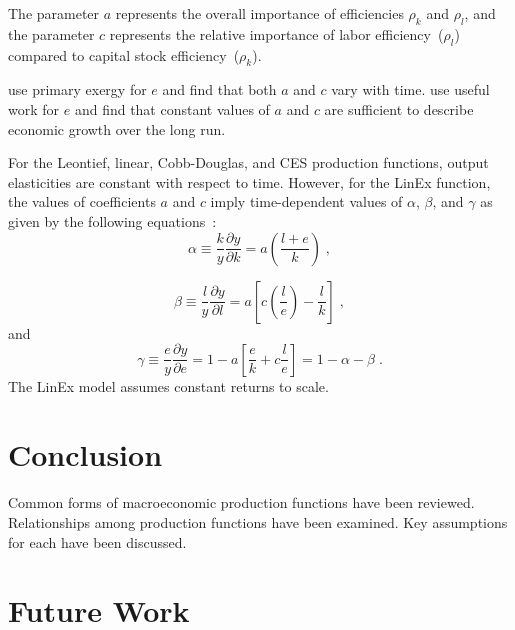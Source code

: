 \documentclass[preprint,authoryear,12pt]{elsarticle}
\begin{document}
The parameter $a$ represents the overall importance of efficiencies $\rho_k$ and $\rho_l$, 
and the parameter $c$ represents the relative importance 
of labor efficiency~($\rho_l$) compared to capital stock efficiency~($\rho_k$). 

\citet{Kummel:2010vz} use primary exergy for $e$ and find that 
both $a$ and $c$ vary with time.
\citet{Warr:2012cg} use useful work for $e$ and find that 
constant values of $a$ and $c$ are sufficient to describe economic growth 
over the long run. 

For the Leontief, linear, Cobb-Douglas, and CES production functions, 
output elasticities are constant with respect to time.
However, for the LinEx function, 
the values of coefficients $a$ and $c$ imply time-dependent
values of $\alpha$, $\beta$, and $\gamma$ as given by the following equations~\citep{Warr:2012cg}:
%
\begin{equation} \label{eq:LINEX_alpha}
  \alpha \equiv \frac{k}{y}\frac{\partial y}{\partial k} = a \left( \frac{l + e}{k} \right) \;,
\end{equation}

\begin{equation} \label{eq:LINEX_beta}
  \beta \equiv \frac{l}{y} \frac{\partial y}{\partial l} 
  = a \left[ c \left( \frac{l}{e}\right) - \frac{l}{k} \right] \;,
\end{equation}
%
and
%
\begin{equation} \label{eq:LINEX_beta_2}
  \gamma \equiv \frac{e}{y} \frac{\partial y}{\partial e} 
         = 1 - a \left[ \frac{e}{k} + c \frac{l}{e} \right] 
         = 1 - \alpha - \beta \;.
\end{equation}
%
The LinEx model assumes constant returns to scale.


\section{Conclusion}
\label{sec:Conclusion}

Common forms of macroeconomic production functions have been reviewed.
Relationships among production functions have been examined.
Key assumptions for each have been discussed.


\section{Future Work}
\label{sec:FutureWork}
\end{document}
